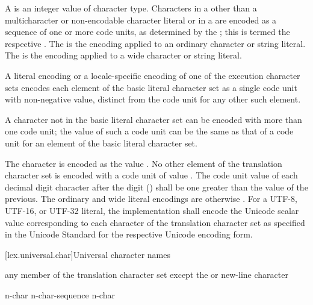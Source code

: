\pnum
A  is an integer value
of character type.
Characters in a 
other than a multicharacter or non-encodable character literal or
in a  are encoded as
a sequence of one or more code units, as determined
by the ;
this is termed the respective .
The  is
the encoding applied to an ordinary character or string literal.
The  is the encoding applied
to a wide character or string literal.

\pnum
A literal encoding or a locale-specific encoding of one of
the execution character sets
encodes each element of the basic literal character set as
a single code unit with non-negative value,
distinct from the code unit for any other such element.
\begin{note}
A character not in the basic literal character set
can be encoded with more than one code unit;
the value of such a code unit can be the same as
that of a code unit for an element of the basic literal character set.
\end{note}
%
%
The  character is encoded as the value .
No other element of the translation character set
is encoded with a code unit of value .
The code unit value of each decimal digit character after the digit  ()
shall be one greater than the value of the previous.
The ordinary and wide literal encodings are otherwise
.
%
%
%
For a UTF-8, UTF-16, or UTF-32 literal,
the implementation shall encode
the Unicode scalar value
corresponding to each character of the translation character set
as specified in the Unicode Standard
for the respective Unicode encoding form.

[lex.universal.char]{Universal character names}

\begin{bnf}
\br
     \textnormal{any member of the translation character set except the  or new-line character}
\end{bnf}

\begin{bnf}
\br
    n-char\br
    n-char-sequence n-char
\end{bnf}

